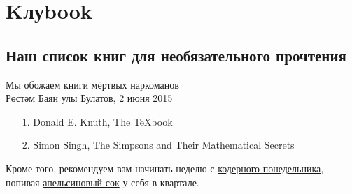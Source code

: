 \section*{Kлуbook} 
\subsection*{Наш список книг для необязательного прочтения} %
\begin{epigraph}
    Мы обожаем книги мёртвых наркоманов\\
    {\normalfont Рөстәм Баян улы Булатов, 2 июня 2015}
\end{epigraph}

\begin{itemize}
        \item[1.] Donald E. Knuth, The {\TeX}book
        \item[2.] Simon Singh, The Simpsons and Their Mathematical Secrets
\end{itemize}

Кроме того, рекомендуем вам начинать неделю с 
\href{https://freecx.github.io/}{кодерного понедельника},
попивая \href{https://citrux.github.io/blog/}{апельсиновый сок} у себя в квартале.
